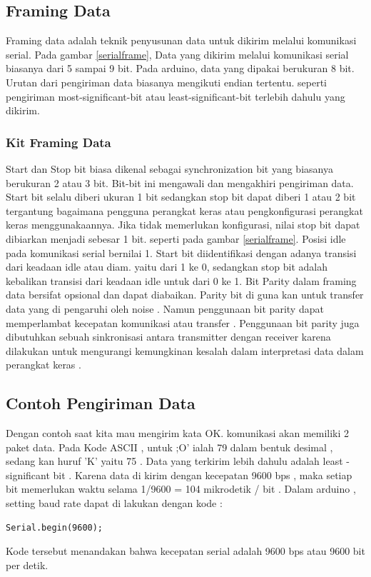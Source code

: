 \subsection{Framing Data}
Framing data adalah teknik penyusunan data untuk dikirim melalui komunikasi serial. Pada gambar \ref{serialframe}, Data yang dikirim melalui komunikasi serial biasanya dari 5 sampai 9 bit. Pada arduino, data yang dipakai berukuran 8 bit. Urutan dari pengiriman data biasanya mengikuti endian tertentu. seperti pengiriman most-significant-bit atau least-significant-bit terlebih dahulu yang dikirim.
\subsubsection{Kit Framing Data}
Start dan Stop bit biasa dikenal sebagai synchronization bit yang biasanya berukuran 2 atau 3 bit. Bit-bit ini mengawali dan mengakhiri pengiriman data. Start bit selalu diberi ukuran 1 bit sedangkan stop bit dapat diberi 1 atau 2 bit tergantung bagaimana pengguna perangkat keras atau pengkonfigurasi perangkat keras menggunakaannya. Jika tidak memerlukan konfigurasi, nilai stop bit dapat dibiarkan menjadi sebesar 1 bit. seperti pada gambar \ref{serialframe}.
Posisi idle pada komunikasi serial bernilai 1. Start bit diidentifikasi dengan adanya transisi dari keadaan idle atau diam. yaitu dari 1 ke 0, sedangkan stop bit adalah kebalikan transisi dari keadaan idle untuk dari 0 ke 1.
Bit Parity dalam framing data bersifat opsional dan dapat diabaikan. Parity bit di guna kan untuk transfer data yang di pengaruhi oleh noise . Namun penggunaan bit parity dapat memperlambat kecepatan komunikasi atau transfer . Penggunaan bit parity juga dibutuhkan sebuah sinkronisasi antara transmitter dengan receiver karena dilakukan untuk mengurangi kemungkinan kesalah dalam interpretasi data dalam perangkat keras .

\subsection{Contoh Pengiriman Data}
Dengan contoh saat kita mau mengirim kata OK. komunikasi akan memiliki 2 paket data. Pada Kode ASCII , untuk ;O' ialah 79 dalam bentuk desimal , sedang kan huruf 'K' yaitu 75 . Data yang terkirim lebih dahulu adalah least - significant bit . Karena data di kirim dengan kecepatan 9600 bps , maka setiap bit memerlukan waktu selama 1/9600 = 104 mikrodetik / bit . Dalam arduino , setting baud rate dapat di lakukan dengan kode :
\begin{verbatim}
Serial.begin(9600);
\end{verbatim}
Kode tersebut menandakan bahwa kecepatan serial adalah 9600 bps atau 9600 bit per detik.

